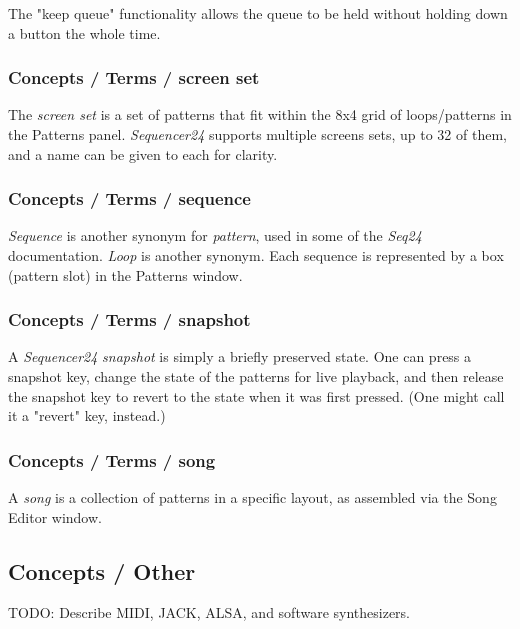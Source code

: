    The "keep queue" functionality allows the queue to be held without
   holding down a button the whole time.

\subsubsection{Concepts / Terms / screen set}
\label{subsubsec:concepts_terms_screen_set}

   The \textsl{screen set}
   is a set of patterns that fit within the 8x4 grid of loops/patterns in the
   Patterns panel.
   \textsl{Sequencer24} supports multiple screens sets, up to 32 of them,
   and a name can be given to each for clarity.

\subsubsection{Concepts / Terms / sequence}
\label{subsubsec:concepts_terms_sequence}

   \textsl{Sequence} is
   another synonym for \textsl{pattern}, used in some of the \textsl{Seq24}
   documentation.  \textsl{Loop} is another synonym.
   Each sequence is represented by a box (pattern slot) in the Patterns window.

\subsubsection{Concepts / Terms / snapshot}
\label{subsubsec:concepts_terms_snapshot}

   A \textsl{Sequencer24} \textsl{snapshot} is simply a briefly preserved state.
   One can press a snapshot key, change the state of the patterns for live
   playback, and then release the snapshot key to revert to the state when
   it was first pressed.  (One might call it a "revert" key, instead.)

\subsubsection{Concepts / Terms / song}
\label{subsubsec:concepts_terms_song}

   A \textsl{song} is a collection of patterns in a specific layout, as
   assembled via the Song Editor window.

\subsection{Concepts / Other}
\label{subsec:concepts_other}

TODO: Describe MIDI, JACK, ALSA, and software synthesizers.

